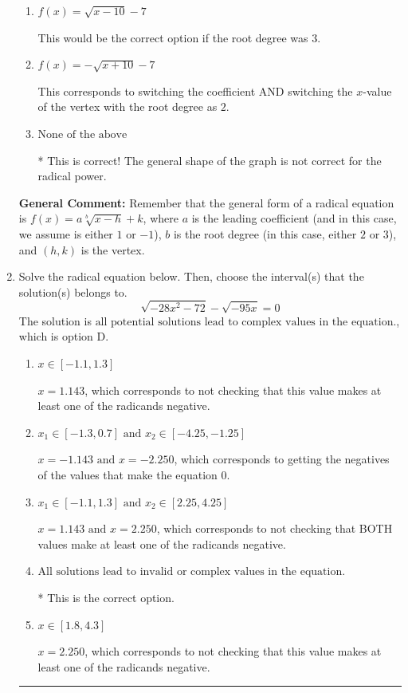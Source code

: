 \documentclass{extbook}[14pt]
\newcommand{\litem}[1]{\item #1

\rule{\textwidth}{0.4pt}}
\begin{document}
\begin{enumerate}
{\begin{enumerate}[label=\Alph*.]
This corresponds to the correct coefficient and switching the $x$-value of the vertex with the root degree as $2$.
\item \( f(x) = \sqrt{x - 10} - 7 \)

This would be the correct option if the root degree was $3$.
\item \( f(x) = - \sqrt{x + 10} - 7 \)

This corresponds to switching the coefficient AND switching the $x$-value of the vertex with the root degree as $2$.
\item \( \text{None of the above} \)

* This is correct! The general shape of the graph is not correct for the radical power.
\end{enumerate}

\textbf{General Comment:} Remember that the general form of a radical equation is $ f(x) = a \sqrt[b]{x - h} + k$, where $a$ is the leading coefficient (and in this case, we assume is either $1$ or $-1$), $b$ is the root degree (in this case, either $2$ or $3$), and $(h, k)$ is the vertex.
}
\litem{
Solve the radical equation below. Then, choose the interval(s) that the solution(s) belongs to.
\[ \sqrt{-28 x^2 - 72} - \sqrt{-95 x} = 0 \]The solution is \( \text{all potential solutions lead to complex values in the equation.} \), which is option D.\begin{enumerate}[label=\Alph*.]
\item \( x \in [-1.1,1.3] \)

$x = 1.143$, which corresponds to not checking that this value makes at least one of the radicands negative.
\item \( x_1 \in [-1.3, 0.7] \text{ and } x_2 \in [-4.25,-1.25] \)

$x = -1.143 \text{ and } x = -2.250$, which corresponds to getting the negatives of the values that make the equation 0.
\item \( x_1 \in [-1.1, 1.3] \text{ and } x_2 \in [2.25,4.25] \)

$x = 1.143 \text{ and } x = 2.250$, which corresponds to not checking that BOTH values make at least one of the radicands negative.
\item \( \text{All solutions lead to invalid or complex values in the equation.} \)

* This is the correct option.
\item \( x \in [1.8,4.3] \)

$x = 2.250$, which corresponds to not checking that this value makes at least one of the radicands negative.
\end{enumerate}

}
\end{enumerate}
\end{document}
